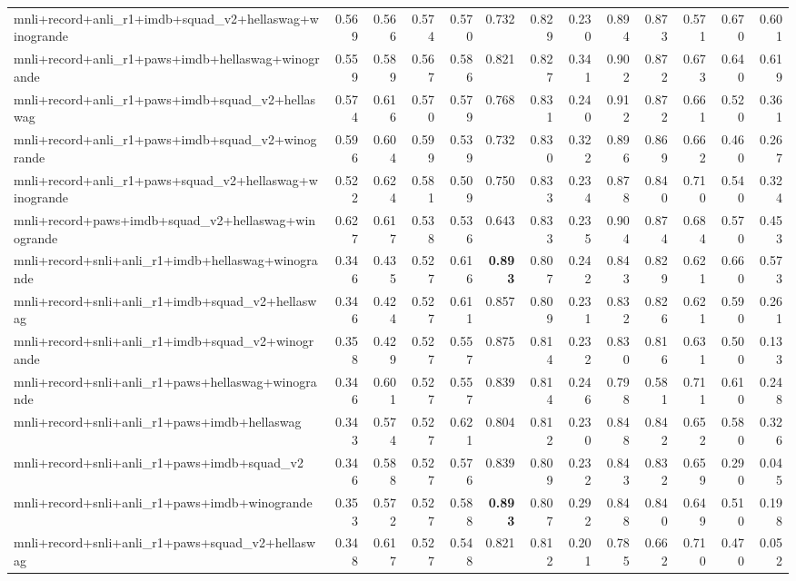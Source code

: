 \begin{table}[t]
\begin{tabular}{lrrrrrrrrrrrr}
    mnli+record+anli\_r1+imdb+squad\_v2+hellaswag+winogrande & 0.569 & 0.566 & 0.574 & 0.570 & 0.732 & 0.829 & 0.230 & 0.894 & 0.873 & 0.571 & 0.670 & 0.601 \\
    mnli+record+anli\_r1+paws+imdb+hellaswag+winogrande & 0.559 & 0.589 & 0.567 & 0.586 & 0.821 & 0.827 & 0.341 & 0.902 & 0.872 & 0.673 & 0.640 & 0.619 \\
    mnli+record+anli\_r1+paws+imdb+squad\_v2+hellaswag & 0.574 & 0.616 & 0.570 & 0.579 & 0.768 & 0.831 & 0.240 & 0.912 & 0.872 & 0.661 & 0.520 & 0.361 \\
    mnli+record+anli\_r1+paws+imdb+squad\_v2+winogrande & 0.596 & 0.604 & 0.599 & 0.539 & 0.732 & 0.830 & 0.322 & 0.896 & 0.869 & 0.662 & 0.460 & 0.267 \\
    mnli+record+anli\_r1+paws+squad\_v2+hellaswag+winogrande & 0.522 & 0.624 & 0.581 & 0.509 & 0.750 & 0.833 & 0.234 & 0.878 & 0.840 & 0.710 & 0.540 & 0.324 \\
    mnli+record+paws+imdb+squad\_v2+hellaswag+winogrande & 0.627 & 0.617 & 0.538 & 0.536 & 0.643 & 0.833 & 0.235 & 0.904 & 0.874 & 0.684 & 0.570 & 0.453 \\
    mnli+record+snli+anli\_r1+imdb+hellaswag+winogrande & 0.346 & 0.435 & 0.527 & 0.616 & \textbf{0.893} & 0.807 & 0.242 & 0.843 & 0.829 & 0.621 & 0.660 & 0.573 \\
    mnli+record+snli+anli\_r1+imdb+squad\_v2+hellaswag & 0.346 & 0.424 & 0.527 & 0.611 & 0.857 & 0.809 & 0.231 & 0.832 & 0.826 & 0.621 & 0.590 & 0.261 \\
    mnli+record+snli+anli\_r1+imdb+squad\_v2+winogrande & 0.358 & 0.429 & 0.527 & 0.557 & 0.875 & 0.814 & 0.232 & 0.830 & 0.816 & 0.631 & 0.500 & 0.133 \\
    mnli+record+snli+anli\_r1+paws+hellaswag+winogrande & 0.346 & 0.601 & 0.527 & 0.557 & 0.839 & 0.814 & 0.246 & 0.798 & 0.581 & 0.711 & 0.610 & 0.248 \\
    mnli+record+snli+anli\_r1+paws+imdb+hellaswag & 0.343 & 0.574 & 0.527 & 0.621 & 0.804 & 0.812 & 0.230 & 0.848 & 0.842 & 0.652 & 0.580 & 0.326 \\
    mnli+record+snli+anli\_r1+paws+imdb+squad\_v2 & 0.346 & 0.588 & 0.527 & 0.576 & 0.839 & 0.809 & 0.232 & 0.843 & 0.832 & 0.659 & 0.290 & 0.045 \\
    mnli+record+snli+anli\_r1+paws+imdb+winogrande & 0.353 & 0.572 & 0.527 & 0.588 & \textbf{0.893} & 0.807 & 0.292 & 0.848 & 0.840 & 0.649 & 0.510 & 0.198 \\
    mnli+record+snli+anli\_r1+paws+squad\_v2+hellaswag & 0.348 & 0.617 & 0.527 & 0.548 & 0.821 & 0.812 & 0.201 & 0.785 & 0.662 & 0.710 & 0.470 & 0.052 \\

\end{tabular}
\end{table}
